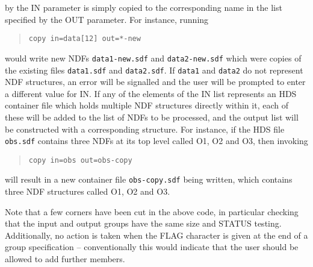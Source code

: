 \documentclass[twoside,11pt]{article}
\renewcommand{\_}{\texttt{\symbol{95}}}
\begin{document}
by the IN parameter is simply copied to the corresponding name in the
list specified by the OUT parameter.  For instance, running
\begin{quote}
\latexonly{\small}
\begin{verbatim}
copy in=data[12] out=*-new
\end{verbatim}
\end{quote}
would write new NDFs {\tt data1-new.sdf} and {\tt data2-new.sdf}
which were copies of the existing files {\tt data1.sdf} and {\tt data2.sdf}.
If {\tt data1} and {\tt data2} do not represent NDF structures,
an error will be signalled and the user will be prompted to enter
a different value for IN.
If any of the elements of the IN list represents an HDS container file
which holds multiple NDF structures directly within it, each of these
will be added to the list of NDFs to be processed, and the
output list will be constructed with a corresponding structure.
For instance, if the HDS file {\tt obs.sdf} contains three NDFs at
its top level called O1, O2 and O3, then invoking
\begin{quote}
\latexonly{\small}
\begin{verbatim}
copy in=obs out=obs-copy
\end{verbatim}
\end{quote}
will result in a new container file {\tt obs-copy.sdf} being written,
which contains three NDF structures called O1, O2 and O3.

Note that a few corners have been cut in the above code,
in particular checking that the input and output groups have the
same size and STATUS testing.  Additionally, no action is taken
when the FLAG character is given at the end of a group specification --
conventionally this would indicate that the user should be allowed
to add further members.

\appendix
\end{document}
